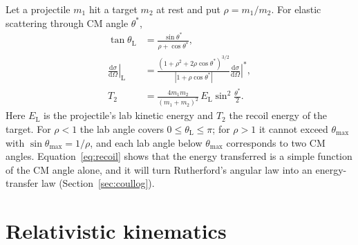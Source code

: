 \documentclass[11pt,a4paper]{book}
\numberwithin{equation}{chapter}
\newcommand{\dd}{\mathrm{d}}
\newcommand{\dsdO}{\frac{\dd\sigma}{\dd\Omega}}
\begin{document}
Let a projectile $m_1$ hit a target $m_2$ at rest and put $\rho=m_1/m_2$. For
elastic scattering through CM angle $\theta^*$,
\begin{align}
  \tan\theta_{\mathrm L} &= \frac{\sin\theta^*}{\rho+\cos\theta^*}, \label{eq:labtan}\\[2pt]
  \left.\dsdO\right|_{\mathrm L} &=
      \frac{(1+\rho^2+2\rho\cos\theta^*)^{3/2}}{|1+\rho\cos\theta^*|}
      \left.\dsdO\right|^{*}, \label{eq:labxs}\\[2pt]
  T_2 &= \frac{4m_1m_2}{(m_1+m_2)^2}\,E_{\mathrm L}\sin^2\frac{\theta^*}{2}.
      \label{eq:recoil}
\end{align}
Here $E_{\mathrm L}$ is the projectile's lab kinetic energy and $T_2$ the recoil
energy of the target. For $\rho<1$ the lab angle covers
$0\le\theta_{\mathrm L}\le\pi$; for $\rho>1$ it cannot exceed
$\theta_{\max}$ with $\sin\theta_{\max}=1/\rho$, and each lab angle below
$\theta_{\max}$ corresponds to two CM angles. Equation~\eqref{eq:recoil} shows
that the energy transferred is a simple function of the CM angle alone, and it
will turn Rutherford's angular law into an energy-transfer law
(Section~\ref{sec:coullog}).

\section{Relativistic kinematics}
\end{document}
